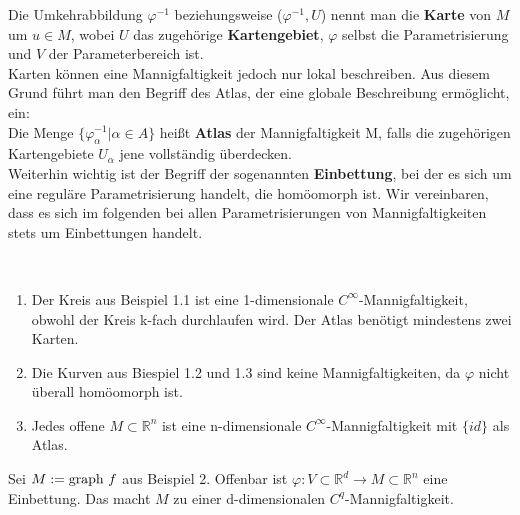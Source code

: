 Die Umkehrabbildung $\varphi^{-1}$ beziehungsweise ($\varphi^{-1}, U$) nennt man die \textbf{Karte} von $M$ um $u\in M$, wobei $U$ das zugehörige \textbf{Kartengebiet}, $\varphi$ selbst die Parametrisierung und $V$ der Parameterbereich ist.\\
Karten können eine Mannigfaltigkeit jedoch nur lokal beschreiben. Aus diesem Grund führt man den Begriff des Atlas, der eine globale Beschreibung ermöglicht, ein:\\
Die Menge $\{\varphi^{-1}_\alpha | \alpha\in A\}$ heißt \textbf{Atlas} der Mannigfaltigkeit M, falls die zugehörigen Kartengebiete $U_\alpha$ jene vollständig überdecken.\\
\linebreak
Weiterhin wichtig ist der Begriff der sogenannten \textbf{Einbettung}, bei der es sich um eine reguläre Parametrisierung handelt, die homöomorph ist. Wir vereinbaren, dass es sich im folgenden bei allen Parametrisierungen von Mannigfaltigkeiten stets um Einbettungen handelt.
\begin{beispiel}\ \\

\begin{enumerate}
\item Der Kreis aus Beispiel 1.1 ist eine 1-dimensionale $C^\infty$-Mannigfaltigkeit, obwohl der Kreis k-fach durchlaufen wird. Der Atlas benötigt mindestens zwei Karten.
\item Die Kurven aus Biespiel 1.2 und 1.3 sind keine Mannigfaltigkeiten, da $\varphi$ nicht überall homöomorph ist.
\item Jedes offene $M\subset\mathbb{R}^n$ ist eine n-dimensionale $C^\infty$-Mannigfaltigkeit mit $\{id\}$ als Atlas.
\end{enumerate}
\end{beispiel}

\begin{beispiel} Sei $M:=\text{graph\ } f$ aus Beispiel 2. Offenbar ist 
$\varphi:V\subset\mathbb{R}^d\rightarrow M\subset\mathbb{R}^n$ 
eine Einbettung. Das macht $M$ zu einer d-dimensionalen $C^q$-Mannigfaltigkeit.
\end{beispiel}

